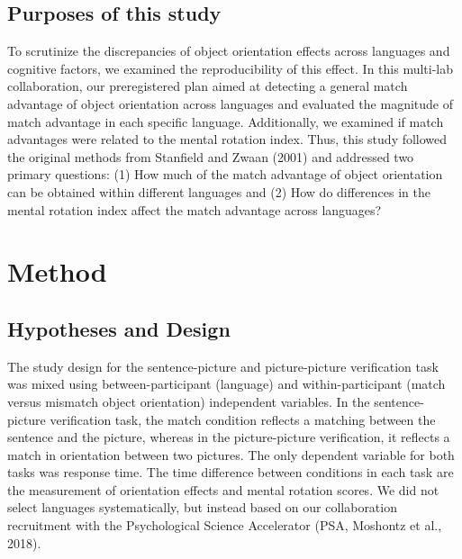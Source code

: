 \documentclass[
  man]{apa7}
\begin{document}
\hypertarget{purposes-of-this-study}{%
\subsection{Purposes of this study}\label{purposes-of-this-study}}

To scrutinize the discrepancies of object orientation effects across languages and cognitive factors, we examined the reproducibility of this effect. In this multi-lab collaboration, our preregistered plan aimed at detecting a general match advantage of object orientation across languages and evaluated the magnitude of match advantage in each specific language. Additionally, we examined if match advantages were related to the mental rotation index. Thus, this study followed the original methods from Stanfield and Zwaan (2001) and addressed two primary questions: (1) How much of the match advantage of object orientation can be obtained within different languages and (2) How do differences in the mental rotation index affect the match advantage across languages?

\hypertarget{method}{%
\section{Method}\label{method}}

\hypertarget{hypotheses-and-design}{%
\subsection{Hypotheses and Design}\label{hypotheses-and-design}}

The study design for the sentence-picture and picture-picture verification task was mixed using between-participant (language) and within-participant (match versus mismatch object orientation) independent variables. In the sentence-picture verification task, the match condition reflects a matching between the sentence and the picture, whereas in the picture-picture verification, it reflects a match in orientation between two pictures. The only dependent variable for both tasks was response time. The time difference between conditions in each task are the measurement of orientation effects and mental rotation scores. We did not select languages systematically, but instead based on our collaboration recruitment with the Psychological Science Accelerator (PSA, Moshontz et al., 2018).
\end{document}
